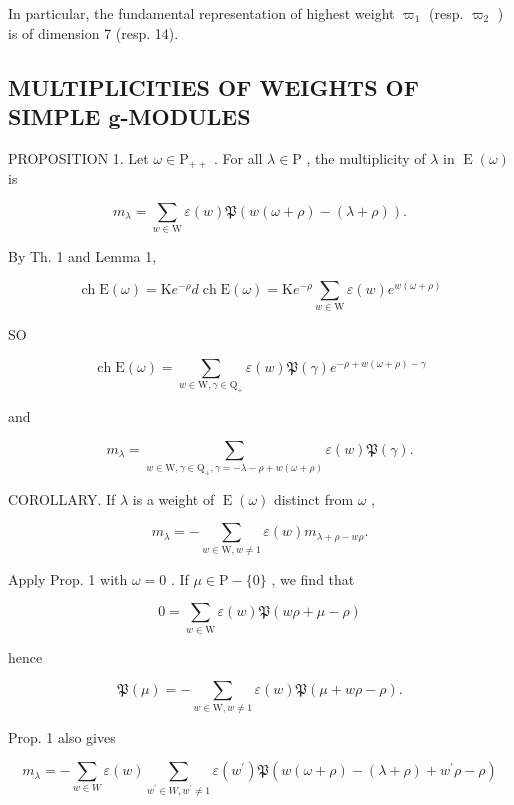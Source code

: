 In particular, the fundamental representation of highest weight \(\varpi_{1}\) (resp. \(\varpi_{2}\) ) is of dimension 7 (resp. 14).

\subsection{MULTIPLICITIES OF WEIGHTS OF SIMPLE g-MODULES}

PROPOSITION 1. Let \(\omega \in \mathrm{P}_{++}\) . For all \(\lambda \in \mathrm{P}\) , the multiplicity of \(\lambda\) in \(\operatorname{E}(\omega)\) is

\[
m _ {\lambda} = \sum_ {w \in \mathrm{W}} \varepsilon (w) \mathfrak {P} (w (\omega + \rho) - (\lambda + \rho)).
\]

By Th. 1 and Lemma 1,

\[
\operatorname{ch} \mathrm{E} (\omega) = \mathrm{K} e ^ {- \rho} d \operatorname{ch} \mathrm{E} (\omega) = \mathrm{K} e ^ {- \rho} \sum_ {w \in \mathrm{W}} \varepsilon (w) e ^ {w (\omega + \rho)}
\]

SO

\[
\operatorname{ch} \mathrm{E} (\omega) = \sum_ {w \in \mathrm{W}, \gamma \in \mathrm{Q} _ {+}} \varepsilon (w) \mathfrak {P} (\gamma) e ^ {- \rho + w (\omega + \rho) - \gamma}
\]

and

\[
m _ {\lambda} = \sum_ {w \in \mathrm{W}, \gamma \in \mathrm{Q} _ {+}, \gamma = - \lambda - \rho + w (\omega + \rho)} \varepsilon (w) \mathfrak {P} (\gamma).
\]

COROLLARY. If \(\lambda\) is a weight of \(\operatorname{E}(\omega)\) distinct from \(\omega\) ,

\[
m _ {\lambda} = - \sum_ {w \in \mathrm{W}, w \neq 1} \varepsilon (w) m _ {\lambda + \rho - w \rho}.
\]

Apply Prop. 1 with \(\omega = 0\) . If \(\mu \in \mathrm{P} - \{0\}\) , we find that

\[
0 = \sum_ {w \in \mathrm{W}} \varepsilon (w) \mathfrak {P} (w \rho + \mu - \rho)
\]

hence

\[
\mathfrak {P} (\mu) = - \sum_ {w \in \mathrm{W}, w \neq 1} \varepsilon (w) \mathfrak {P} (\mu + w \rho - \rho).\tag{1}
\]

Prop. 1 also gives

\[
m _ {\lambda} = - \sum_ {w \in W} \varepsilon (w) \sum_ {w ^ {\prime} \in W, w ^ {\prime} \neq 1} \varepsilon (w ^ {\prime}) \mathfrak {P} (w (\omega + \rho) - (\lambda + \rho) + w ^ {\prime} \rho - \rho)
\]

